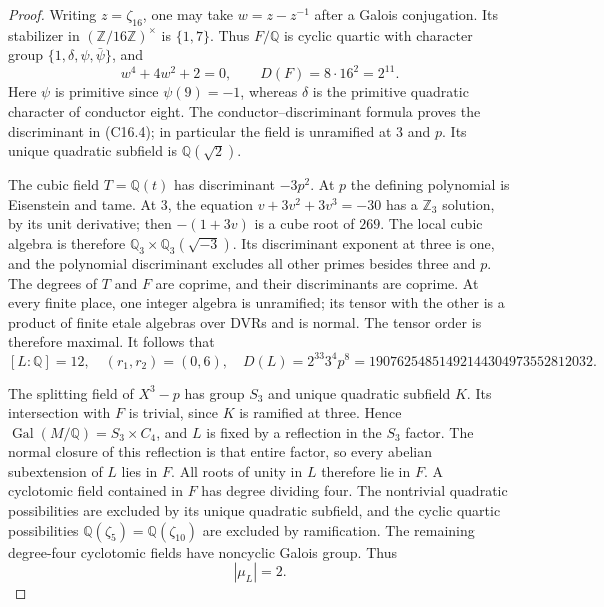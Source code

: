 \begin{proof}
Writing $z=\zeta_{16}$, one may take $w=z-z^{-1}$ after a
Galois conjugation.  Its stabilizer in
$(\mathbb Z/16\mathbb Z)^\times$ is $\{1,7\}$.
Thus $F/\mathbb Q$ is cyclic quartic with character group
$\{1,\delta,\psi,\bar\psi\}$, and
\[
       w^4+4w^2+2=0,
       \qquad D(F)=8\cdot16^2=2^{11}.
 \tag{C16.4}
\]
Here $\psi$ is primitive since $\psi(9)=-1$, whereas $\delta$
is the primitive quadratic character of conductor eight.
The conductor--discriminant formula proves the discriminant in
(C16.4); in particular the field is unramified at $3$ and $p$.
Its unique quadratic subfield is $\mathbb Q(\sqrt2)$.

The cubic field $T=\mathbb Q(t)$ has discriminant $-3p^2$.
At $p$ the defining polynomial is Eisenstein and tame.  At $3$,
the equation $v+3v^2+3v^3=-30$ has a $\mathbb Z_3$ solution,
by its unit derivative; then $-(1+3v)$ is a cube root of $269$.
The local cubic algebra is therefore
$\mathbb Q_3\times\mathbb Q_3(\sqrt{-3})$.
Its discriminant exponent at three is one, and the polynomial
discriminant excludes all other primes besides three and $p$.
The degrees of $T$ and $F$ are coprime, and their discriminants
are coprime.  At every finite place, one integer algebra is
unramified; its tensor with the other is a product of finite
etale algebras over DVRs and is normal.  The tensor order is
therefore maximal.  It follows that
\[
 [L:\mathbb Q]=12,\quad (r_1,r_2)=(0,6),\quad
 D(L)=2^{33}3^4p^8=19076254851492144304973552812032.
 \tag{C16.5}
\]

The splitting field of $X^3-p$ has group $S_3$ and unique
quadratic subfield $K$.  Its intersection with $F$ is trivial,
since $K$ is ramified at three.  Hence
$\operatorname{Gal}(M/\mathbb Q)=S_3\times C_4$, and $L$ is
fixed by a reflection in the $S_3$ factor.  The normal closure
of this reflection is that entire factor, so every abelian
subextension of $L$ lies in $F$.  All roots of unity in $L$
therefore lie in $F$.  A cyclotomic field contained in $F$ has
degree dividing four.  The nontrivial quadratic possibilities
are excluded by its unique quadratic subfield, and the cyclic
quartic possibilities $\mathbb Q(\zeta_5)=\mathbb Q(\zeta_{10})$
are excluded by ramification.  The remaining degree-four
cyclotomic fields have noncyclic Galois group.  Thus
\[
                         |\mu_L|=2.
 \tag{C16.6}
\]


\end{proof}
